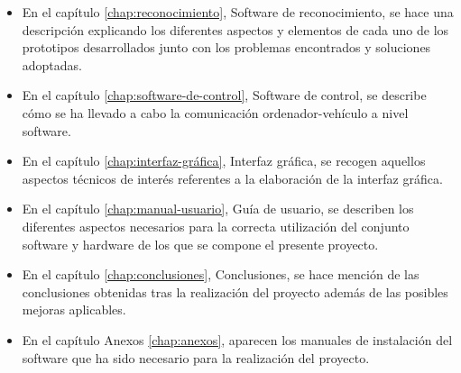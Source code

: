 \begin{itemize}
\item En el capítulo \ref{chap:reconocimiento}, Software de reconocimiento, se hace una descripción explicando los diferentes aspectos y elementos de cada uno de los prototipos desarrollados junto con los problemas encontrados y soluciones adoptadas.

\item En el capítulo \ref{chap:software-de-control}, Software de control, se describe cómo se ha llevado a cabo la comunicación ordenador-vehículo a nivel software.

\item En el capítulo \ref{chap:interfaz-gráfica}, Interfaz gráfica, se recogen aquellos aspectos técnicos de interés referentes a la elaboración de la interfaz gráfica.

\item En el capítulo \ref{chap:manual-usuario}, Guía de usuario, se describen los diferentes aspectos necesarios para la correcta utilización del conjunto software y hardware de los que se compone el presente proyecto.

\item En el capítulo \ref{chap:conclusiones}, Conclusiones, se hace mención de las conclusiones obtenidas tras la realización del proyecto además de las posibles mejoras aplicables.

\item En el capítulo Anexos \ref{chap:anexos}, aparecen los manuales de instalación del software que ha sido necesario para la realización del proyecto.

\end{itemize}
